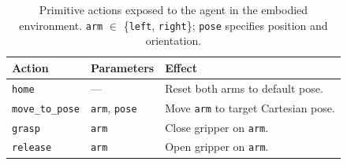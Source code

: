 \documentclass[11pt]{article}
\begin{document}
\begin{enumerate}[itemsep=0pt, topsep=2pt, parsep=0pt]
\begin{table}[h]
\centering
\small
\begin{tabular}{@{}lll@{}}
\toprule
\textbf{Action} & \textbf{Parameters} & \textbf{Effect} \\
\midrule
\texttt{home}         & ---                       & Reset both arms to default pose. \\
\texttt{move\_to\_pose} & \texttt{arm}, \texttt{pose} & Move \texttt{arm} to target Cartesian pose. \\
\texttt{grasp}        & \texttt{arm}              & Close gripper on \texttt{arm}. \\
\texttt{release}      & \texttt{arm}              & Open gripper on \texttt{arm}. \\
\bottomrule
\end{tabular}
\caption{Primitive actions exposed to the agent in the embodied environment.
\texttt{arm} $\in$ \{\texttt{left}, \texttt{right}\}; \texttt{pose} specifies position and orientation.}
\label{tab:embodied-actions}
\end{table}




\end{enumerate}
\end{document}
